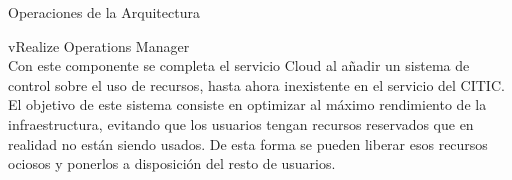 \begin{subsection}{Operaciones de la Arquitectura}
\begin{subsubsection}{vRealize Operations Manager}
        \\
        Con este componente se completa el servicio Cloud al añadir un sistema de control sobre el uso de recursos, hasta ahora inexistente en el servicio del CITIC. El objetivo de este sistema consiste en optimizar al máximo rendimiento de la infraestructura, evitando que los usuarios tengan recursos reservados que en realidad no están siendo usados. De esta forma se pueden liberar esos recursos ociosos y ponerlos a disposición del resto de usuarios.
    \end{subsubsection}

    
\end{subsection}